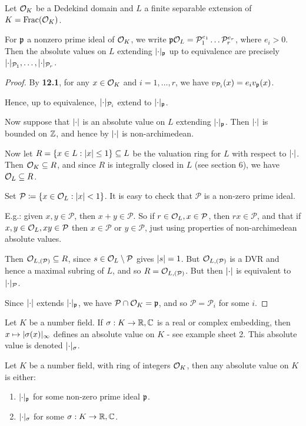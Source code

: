 \documentclass[10pt,a4paper]{article}
\begin{document}
\begin{theorem}
  Let $\mathcal{O}_K$ be a Dedekind domain and $L$ a finite separable extension of $K = \operatorname{Frac}(\mathcal{O}_K)$.

  For $\mathfrak{p}$ a nonzero prime ideal of $\mathcal{O}_K$, we write $\mathfrak{p}\mathcal{O}_L = \mathcal{P}_1^{e_1} \ldots \mathcal{P}_r^{e_r}$, where $e_i >0$. Then the absolute values on $L$ extending $\lvert\cdot\rvert_{\mathfrak{p}}$ up to equivalence are precisely $\lvert\cdot\rvert_{\mathcal{P}_1}, \ldots, \lvert\cdot\rvert_{\mathcal{P}_r}$.
\end{theorem}
\begin{proof}
  By \textbf{12.1}, for any $x \in \mathcal{O}_K$ and $i = 1, \ldots, r$, we have $v_{\mathcal{P}_i}(x) = e_i v_{\mathfrak{p}}(x)$.

  Hence, up to equivalence, $\lvert\cdot\rvert_{\mathcal{P}_i}$ extend to $\lvert\cdot\rvert_{\mathfrak{p}}$.

  Now suppose that $\lvert\cdot\rvert$ is an absolute value on $L$ extending $\lvert\cdot\rvert_{\mathfrak{p}}$. Then $\lvert\cdot\rvert$ is bounded on $\mathbb{Z}$, and hence by $\lvert\cdot\rvert$ is non-archimedean.

  Now let $R = \{x \in L: \lvert x\rvert \leq 1\} \subseteq L$ be the valuation ring for $L$ with respect to $\lvert\cdot\rvert$. Then $\mathcal{O}_K \subseteq R$, and since $R$ is integrally closed in $L$ (see section 6), we have $\mathcal{O}_L \subseteq R$.

  Set $\mathcal{P}\coloneqq \{x \in \mathcal{O}_L: \lvert x\rvert < 1\}$. It is easy to check that $\mathcal{P}$ is a non-zero prime ideal.

  E.g.: given $x, y \in \mathcal{P}$, then $x+y \in \mathcal{P}$. So if $r \in \mathcal{O}_L, x \in \mathcal{P}$, then $rx \in \mathcal{P}$, and that if $x, y \in \mathcal{O}_L, xy \in \mathcal{P}$ then $x \in \mathcal{P}$ or $y \in \mathcal{P}$, just using properties of non-archimedean absolute values.

  Then $\mathcal{O}_{L, (\mathcal{P})} \subseteq R$, since $s \in \mathcal{O}_L\setminus \mathcal{P}$ gives $\lvert s\rvert = 1$. But $\mathcal{O}_{L, (\mathcal{P})}$ is a DVR and hence a maximal subring of $L$, and so $R = \mathcal{O}_{L, (\mathcal{P})}$. But then $\lvert\cdot\rvert$ is equivalent to $\lvert\cdot\rvert_{\mathcal{P}}$.

  Since $\lvert\cdot\rvert$ extends $\lvert\cdot\rvert_{\mathfrak{p}}$, we have $\mathcal{P}\cap \mathcal{O}_K = \mathfrak{p}$, and so $\mathcal{P} = \mathcal{P}_i$ for some $i$.
\end{proof}
Let $K$ be a number field. If $\sigma: K \to \mathbb{R}, \mathbb{C}$ is a real or complex embedding, then $x \mapsto \lvert\sigma(x)\rvert_\infty$ defines an absolute value on $K$ - see example sheet 2. This absolute value is denoted $\lvert\cdot\rvert_\sigma$.
\begin{corollary}
  Let $K$ be a number field, with ring of integers $\mathcal{O}_K$, then any absolute value on $K$ is either:
  \begin{enumerate}
    \item $\lvert\cdot\rvert_{\mathfrak{p}}$ for some non-zero prime ideal $\mathfrak{p}$.
    \item $\lvert\cdot\rvert_\sigma$ for some $\sigma : K \to \mathbb{R}, \mathbb{C}$.
  \end{enumerate}
\end{corollary}
\end{document}
